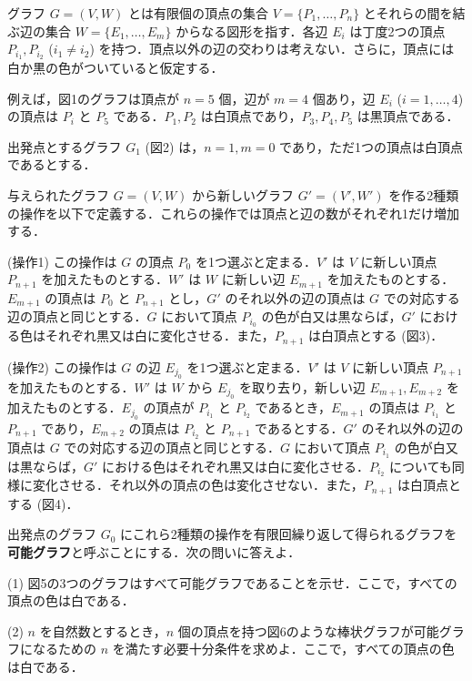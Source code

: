 \documentclass[../../main.tex]{subfiles}
\begin{document}
グラフ $G = (V, W)$ とは有限個の頂点の集合 $V = \{P_1, \dots, P_n\}$ とそれらの間を結ぶ辺の集合 $W = \{E_1, \dots, E_m\}$ からなる図形を指す．各辺 $E_i$ は丁度2つの頂点 $P_{i_1}, P_{i_2}$ ($i_1 \neq i_2$) を持つ．頂点以外の辺の交わりは考えない．さらに，頂点には白か黒の色がついていると仮定する．

例えば，図1のグラフは頂点が $n=5$ 個，辺が $m=4$ 個あり，辺 $E_i$ ($i=1, \dots, 4$) の頂点は $P_i$ と $P_5$ である．$P_1, P_2$ は白頂点であり，$P_3, P_4, P_5$ は黒頂点である．

出発点とするグラフ $G_1$ (図2) は，$n=1, m=0$ であり，ただ1つの頂点は白頂点であるとする．

与えられたグラフ $G = (V, W)$ から新しいグラフ $G' = (V', W')$ を作る2種類の操作を以下で定義する．これらの操作では頂点と辺の数がそれぞれ1だけ増加する．

(操作1) この操作は $G$ の頂点 $P_0$ を1つ選ぶと定まる．$V'$ は $V$ に新しい頂点 $P_{n+1}$ を加えたものとする．$W'$ は $W$ に新しい辺 $E_{m+1}$ を加えたものとする．$E_{m+1}$ の頂点は $P_0$ と $P_{n+1}$ とし，$G'$ のそれ以外の辺の頂点は $G$ での対応する辺の頂点と同じとする．$G$ において頂点 $P_{i_0}$ の色が白又は黒ならば，$G'$ における色はそれぞれ黒又は白に変化させる．また，$P_{n+1}$ は白頂点とする (図3)．

(操作2) この操作は $G$ の辺 $E_{j_0}$ を1つ選ぶと定まる．$V'$ は $V$ に新しい頂点 $P_{n+1}$ を加えたものとする．$W'$ は $W$ から $E_{j_0}$ を取り去り，新しい辺 $E_{m+1}, E_{m+2}$ を加えたものとする．$E_{j_0}$ の頂点が $P_{i_1}$ と $P_{i_2}$ であるとき，$E_{m+1}$ の頂点は $P_{i_1}$ と $P_{n+1}$ であり，$E_{m+2}$ の頂点は $P_{i_2}$ と $P_{n+1}$ であるとする．$G'$ のそれ以外の辺の頂点は $G$ での対応する辺の頂点と同じとする．$G$ において頂点 $P_{i_1}$ の色が白又は黒ならば，$G'$ における色はそれぞれ黒又は白に変化させる．$P_{i_2}$ についても同様に変化させる．それ以外の頂点の色は変化させない．また，$P_{n+1}$ は白頂点とする (図4)．

出発点のグラフ $G_0$ にこれら2種類の操作を有限回繰り返して得られるグラフを\textbf{可能グラフ}と呼ぶことにする．次の問いに答えよ．

(1) 図5の3つのグラフはすべて可能グラフであることを示せ．ここで，すべての頂点の色は白である．

(2) $n$ を自然数とするとき，$n$ 個の頂点を持つ図6のような棒状グラフが可能グラフになるための $n$ を満たす必要十分条件を求めよ．ここで，すべての頂点の色は白である．
\end{document}
